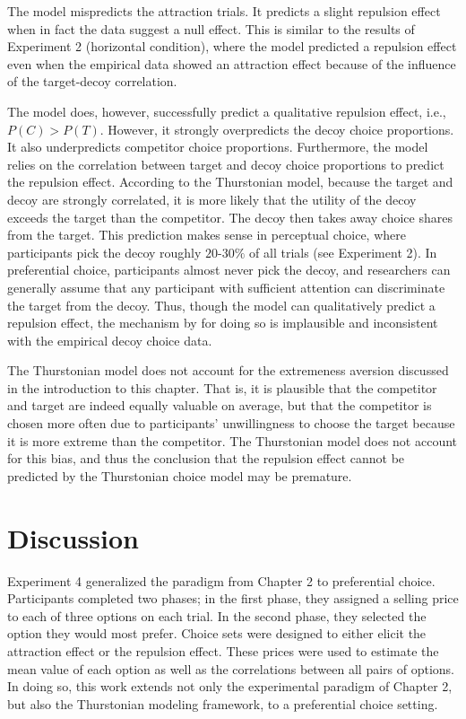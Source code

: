 The model mispredicts the attraction trials. It predicts a slight repulsion effect when in fact the data suggest a null effect. This is similar to the results of Experiment 2 (horizontal condition), where the model predicted a repulsion effect even when the empirical data showed an attraction effect because of the influence of the target-decoy correlation.

The model does, however, successfully predict a qualitative repulsion effect, i.e., $P(C)>P(T)$. However, it strongly overpredicts the decoy choice proportions. It also underpredicts competitor choice proportions. Furthermore, the model relies on the correlation between target and decoy choice proportions to predict the repulsion effect. According to the Thurstonian model, because the target and decoy are strongly correlated, it is more likely that the utility of the decoy exceeds the target than the competitor. The decoy then takes away choice shares from the target. This prediction makes sense in perceptual choice, where  participants pick the decoy roughly $20$-$30\%$ of all trials (see Experiment 2). In preferential choice, participants almost never pick the decoy, and researchers can generally assume that any participant with sufficient attention can discriminate the target from the decoy. Thus, though the model can qualitatively predict a repulsion effect, the mechanism by for doing so is implausible and inconsistent with the empirical decoy choice data.

The Thurstonian model does not account for the extremeness aversion discussed in the introduction to this chapter. That is, it is plausible that the competitor and target are indeed equally valuable on average, but that the competitor is chosen more often due to participants' unwillingness to choose the target because it is more extreme than the competitor. The Thurstonian model does not account for this bias, and thus the conclusion that the repulsion effect cannot be predicted by the Thurstonian choice model may be premature.

\section{Discussion}

Experiment 4 generalized the paradigm from Chapter 2 to preferential choice. Participants completed two phases; in the first phase, they assigned a selling price to each of three options on each trial. In the second phase, they selected the option they would most prefer. Choice sets were designed to either elicit the attraction effect or the repulsion effect. These prices were used to estimate the mean value of each option as well as the correlations between all pairs of options. In doing so, this work extends not only the experimental paradigm of Chapter 2, but also the Thurstonian modeling framework, to a preferential choice setting.

